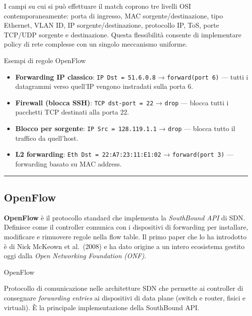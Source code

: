 \documentclass[
  italian,
  openany]{book}
\providecommand{\tightlist}{%
  \setlength{\itemsep}{0pt}\setlength{\parskip}{0pt}}
\begin{document}
I campi su cui si può effettuare il match coprono tre livelli OSI
contemporaneamente: porta di ingresso, MAC sorgente/destinazione, tipo
Ethernet, VLAN ID, IP sorgente/destinazione, protocollo IP, ToS, porte
TCP/UDP sorgente e destinazione. Questa flessibilità consente di
implementare policy di rete complesse con un singolo meccanismo
uniforme.

\begin{callouttip}{Esempi di regole OpenFlow}

\begin{itemize}
\tightlist
\item
  \textbf{Forwarding IP classico}: \texttt{IP\ Dst\ =\ 51.6.0.8} →
  \texttt{forward(port\ 6)} --- tutti i datagrammi verso quell'IP
  vengono instradati sulla porta 6.
\item
  \textbf{Firewall (blocca SSH)}: \texttt{TCP\ dst-port\ =\ 22} →
  \texttt{drop} --- blocca tutti i pacchetti TCP destinati alla porta
  22.
\item
  \textbf{Blocco per sorgente}: \texttt{IP\ Src\ =\ 128.119.1.1} →
  \texttt{drop} --- blocca tutto il traffico da quell'host.
\item
  \textbf{L2 forwarding}: \texttt{Eth\ Dst\ =\ 22:A7:23:11:E1:02} →
  \texttt{forward(port\ 3)} --- forwarding basato su MAC address.
\end{itemize}

\end{callouttip}

\begin{center}\rule{0.5\linewidth}{0.5pt}\end{center}

\subsection{OpenFlow}\label{openflow}

\textbf{OpenFlow} è il protocollo standard che implementa la
\emph{SouthBound API} di SDN. Definisce come il controller comunica con
i dispositivi di forwarding per installare, modificare e rimuovere
regole nella flow table. Il primo paper che lo ha introdotto è di Nick
McKeown et al.~(2008) e ha dato origine a un intero ecosistema gestito
oggi dalla \emph{Open Networking Foundation (ONF)}.

\begin{calloutdefinition}{OpenFlow}

Protocollo di comunicazione nelle architetture SDN che permette ai
controller di consegnare \emph{forwarding entries} ai dispositivi di
data plane (switch e router, fisici e virtuali). È la principale
implementazione della SouthBound API.

\end{calloutdefinition}
\end{document}
